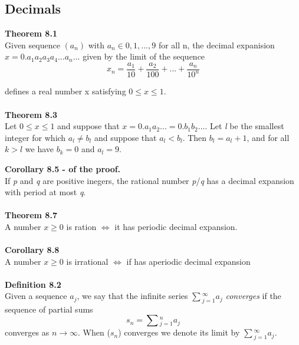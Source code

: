\documentclass{article}
\begin{document}
\subsection{Decimals}
\textbf{Theorem 8.1}\\
Given sequence $(a_{n})$ with $a_{n} \in {0,1,...,9}$ for all n, the decimal expanision $x=0.a_{1}a_{2}a_{3}a_{4}...a_{n}...$ given by the limit of the sequence \\

\begin{equation}
    x_{n}=\frac{a_{1}}{10}+\frac{{a}_{2}}{100}+...+\frac{{a}_{n}}{10^{n}}
\end{equation}


defines a real number x satisfying $0 \leq x \leq 1$.\\
\\
\textbf{Theorem 8.3}\\
Let $0\leq x \leq 1$ and suppose that $x=0.{a}_{1}{a}_{2}... = 0.{b}_{1}{b}_{2}...$. Let \textit{l} be the smallest integer for which ${a}_{\textit{l}} \neq {b}_{\textit{l}}$ and suppose that ${a}_{\textit{l}} < {b}_{\textit{l}}$.
Then ${b}_{\textit{l}} = {a}_{\textit{l}}+1$, and for all $k > \textit{l}$ we have ${b}_{\textit{k}}=0$ and ${a}_{\textit{l}}=9$.

\textbf{Corollary 8.5 - of the proof.}\\
If \textit{p} and \textit{q} are positive inegers, the rational number \textit{p}/\textit{q}
has a decimal expansion with period at most \textit{q}.\\
\\
\textbf{Theorem 8.7}\\
A number $x \geq 0$ is ration $\Leftrightarrow$ it has periodic decimal expansion. \\
\\
\textbf{Corollary 8.8}\\
A number $x \geq 0$ is irrational $\Leftrightarrow$ if has aperiodic decimal expansion\\
\\
\textbf{Definition 8.2}\\
Given a sequence ${{a}_{j}}$, we say that the infinite series ${\sum{^{\infty}_{j=1}}{a}_{j}}$ \emph{converges} if 
the sequence of partial sums \\
\begin{equation}
    {s}_{n}={\sum{^{n}_{j=1}}{a}_{j}}
\end{equation}
converges as $n \rightarrow \infty$. When (${s}_{n}$) converges we denote its limit by ${\sum{^{\infty}_{j=1}}{a}_{j}}$.\\
\end{document}
